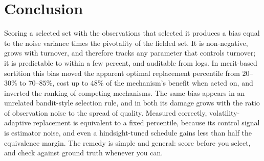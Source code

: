 \documentclass[sigconf,anonymous,review,nonacm]{acmart}
\begin{document}
\section{Conclusion}

Scoring a selected set with the observations that selected it produces a bias equal to
the noise variance times the pivotality of the fielded set. It is non-negative, grows with
turnover, and therefore tracks any parameter that controls turnover; it is predictable to
within a few percent, and auditable from logs. In merit-based sortition this bias moved the apparent optimal
replacement percentile from $20$--$30\%$ to $70$--$85\%$, cost up to $48\%$ of the
mechanism's benefit when acted on, and inverted the ranking of competing mechanisms. The
same bias appears in an unrelated bandit-style selection rule, and in both its damage grows
with the ratio of observation noise to the spread of quality. Measured correctly, volatility-adaptive replacement is equivalent to a
fixed percentile, because its control signal is estimator noise, and even a
hindsight-tuned schedule gains less than half the equivalence margin. The remedy is simple and
general: score before you select, and check against ground truth whenever you can.



\end{document}
